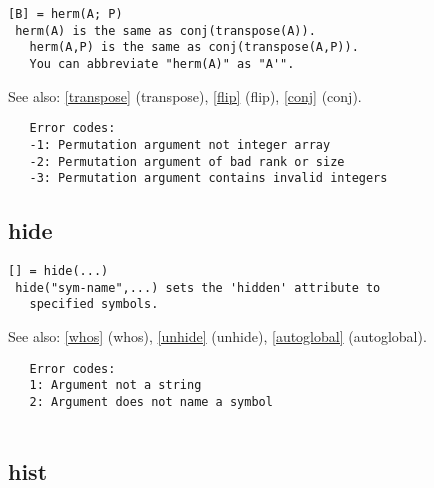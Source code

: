 \documentclass[a4paper]{article}
\begin{document}
\begin{tscreen}
\begin{verbatim}
[B] = herm(A; P)
 herm(A) is the same as conj(transpose(A)).
   herm(A,P) is the same as conj(transpose(A,P)).
   You can abbreviate "herm(A)" as "A'".
\end{verbatim}

See also: \ref{transpose} {(transpose)}, \ref{flip} {(flip)}, \ref{conj} {(conj)}.
\begin{verbatim}
   Error codes:
   -1: Permutation argument not integer array
   -2: Permutation argument of bad rank or size
   -3: Permutation argument contains invalid integers 
\end{verbatim}
\end{tscreen}





\subsection{hide\label{hide}}

\begin{tscreen}
\begin{verbatim}
[] = hide(...)
 hide("sym-name",...) sets the 'hidden' attribute to
   specified symbols.
\end{verbatim}

See also: \ref{whos} {(whos)}, \ref{unhide} {(unhide)}, \ref{autoglobal} {(autoglobal)}.
\begin{verbatim}
   Error codes:
   1: Argument not a string
   2: Argument does not name a symbol
   
\end{verbatim}
\end{tscreen}





\subsection{hist\label{hist}}
\end{document}
